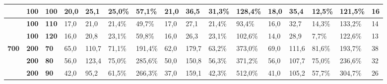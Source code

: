 \documentclass[conference,compsoc]{IEEEtran}
\begin{document}
\begin{adjustbox}{angle=90,width={\textwidth},totalheight={22cm},keepaspectratio,caption={Tabela de Resultados},center={14cm}}
\begin{tabular}{|l|l|l|l|l|l|l|l|l|l|l|l|l|l|l|l|}
\textbf{}                                            & \textbf{100}                                     & \textbf{100}                                        & 20,0            & 25,1           & 25,0\%              & 57,1\%             & 21,0            & 36,5           & 31,3\%              & 128,4\%            & 18,0            & 35,4           & 12,5\%              & 121,5\%            & 16                               \\ \hline
\textbf{}                                            & \textbf{100}                                     & \textbf{110}                                        & 17,0            & 21,0           & 21,4\%              & 49,7\%             & 17,0            & 27,1           & 21,4\%              & 93,4\%             & 16,0            & 32,7           & 14,3\%              & 133,2\%            & 14                               \\ \hline
\textbf{}                                            & \textbf{100}                                     & \textbf{120}                                        & 16,0            & 20,8           & 23,1\%              & 59,8\%             & 16,0            & 26,3           & 23,1\%              & 102,6\%            & 14,0            & 28,9           & 7,7\%               & 122,6\%            & 13                               \\ \hline
\textbf{700}                                         & \textbf{200}                                     & \textbf{70}                                         & 65,0            & 110,7          & 71,1\%              & 191,4\%            & 62,0            & 179,7          & 63,2\%              & 373,0\%            & 69,0            & 111,6          & 81,6\%              & 193,7\%            & 38                               \\ \hline
\textbf{}                                            & \textbf{200}                                     & \textbf{80}                                         & 56,0            & 123,4          & 75,0\%              & 285,6\%            & 50,0            & 150,8          & 56,3\%              & 371,2\%            & 56,0            & 107,7          & 75,0\%              & 236,6\%            & 32                               \\ \hline
\textbf{}                                            & \textbf{200}                                     & \textbf{90}                                         & 42,0            & 95,2           & 61,5\%              & 266,3\%            & 37,0            & 159,1          & 42,3\%              & 512,0\%            & 41,0            & 105,2          & 57,7\%              & 304,7\%            & 26                               \\ \hline

\end{tabular}
\end{adjustbox}
\end{document}
